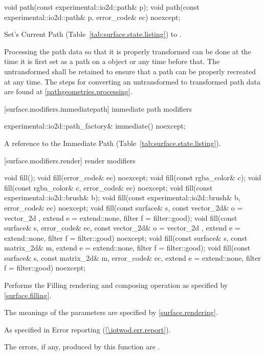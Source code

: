 \begin{itemdecl}
void path(const experimental::io2d::path& p);
void path(const experimental::io2d::path& p, error_code& ec) noexcept;
\end{itemdecl}
\begin{itemdescr}
\pnum
\effects
Set's Current Path (Table~\ref{tab:surface.state.listing}) to .

\pnum
\remarks
Processing the path data so that it is properly transformed can be done at the time it is first set as a path on a  object or any time before that. The untransformed  shall be retained to ensure that a path can be properly recreated at any time. The steps for converting an untransformed  to transformed path data are found at \ref{pathgeometries.processing}.
\end{itemdescr}

 [surface.modifiers.immediatepath] { immediate path modifiers}

\begin{itemdecl}
experimental::io2d::path_factory& immediate() noexcept;
\end{itemdecl}
\begin{itemdescr}
\pnum
\returns
A reference to the Immediate Path (Table~\ref{tab:surface.state.listing}).
\end{itemdescr}

 [surface.modifiers.render] { render modifiers}

\begin{itemdecl}
void fill();
void fill(error_code& ec) noexcept;
void fill(const rgba_color& c);
void fill(const rgba_color& c, error_code& ec) noexcept;
void fill(const experimental::io2d::brush& b);
void fill(const experimental::io2d::brush& b, error_code& ec) noexcept;
void fill(const surface& s, const vector_2d& o = vector_2d{ },
  extend e = extend::none, filter f = filter::good);
void fill(const surface& s, error_code& ec,
  const vector_2d& o = vector_2d{ }, extend e = extend::none,
  filter f = filter::good) noexcept;
void fill(const surface& s, const matrix_2d& m, extend e = extend::none,
  filter f = filter::good);
void fill(const surface& s, const matrix_2d& m, error_code& ec,
  extend e = extend::none, filter f = filter::good) noexcept;
\end{itemdecl}
\begin{itemdescr}
\pnum
\effects
Performs the Filling rendering and composing operation as specified by \ref{surface.filling}.

\pnum
The meanings of the parameters are specified by \ref{surface.rendering}.

\pnum
\throws
As specified in Error reporting (\ref{\iotwod.err.report}).

\pnum
\errors
The errors, if any, produced by this function are .
\end{itemdescr}

